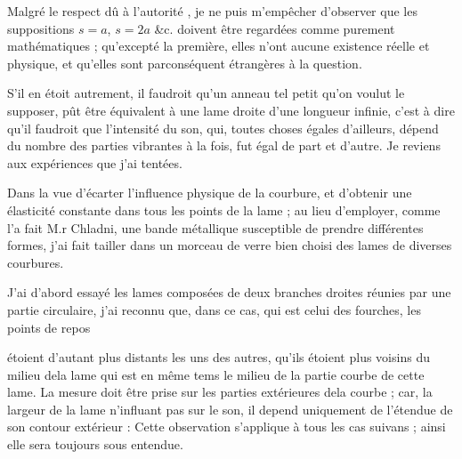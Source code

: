 \documentclass[11pt,a4paper]{article}
\begin{document}
Malgré le respect dû à l'autorité     , je
ne puis m'empêcher d'observer que les suppositions $s=a$, $s=2a$ \&c.
doivent être regardées comme purement mathématiques ; qu'excepté
la première, elles n'ont aucune existence réelle et physique,
et qu'elles sont parconséquent étrangères à la question.

S'il en étoit autrement, il faudroit qu'un anneau tel petit qu'on
voulut le supposer, pût être équivalent à une lame droite
d'une longueur infinie, c'est à dire qu'il faudroit que l'intensité
du son, qui, toutes choses égales d'ailleurs, dépend du nombre
des parties vibrantes à la fois, fut égal de part et d'autre.
Je reviens aux expériences que j'ai tentées.

Dans la vue d'écarter l'influence physique de la courbure,
et d'obtenir une élasticité constante dans tous les points de
la lame ; au lieu d'employer, comme l'a fait M.r Chladni,
une bande métallique susceptible de prendre différentes formes,
j'ai fait tailler dans un morceau de verre bien choisi
des lames de diverses courbures.

J'ai d'abord essayé les lames composées de deux branches
droites réunies par une partie circulaire, j'ai reconnu que,
dans ce cas, qui est celui des fourches, les points de repos



étoient d'autant plus distants les uns des autres, qu'ils étoient plus
voisins du milieu dela lame qui est en même tems le milieu
de la partie courbe de cette lame. La mesure doit être
prise sur les parties extérieures dela courbe ; car, la largeur
de la lame n'influant pas sur le son, il depend uniquement
de l'étendue de son contour extérieur : Cette observation
s'applique à tous les cas suivans ; ainsi elle sera toujours
sous entendue.
\end{document}
